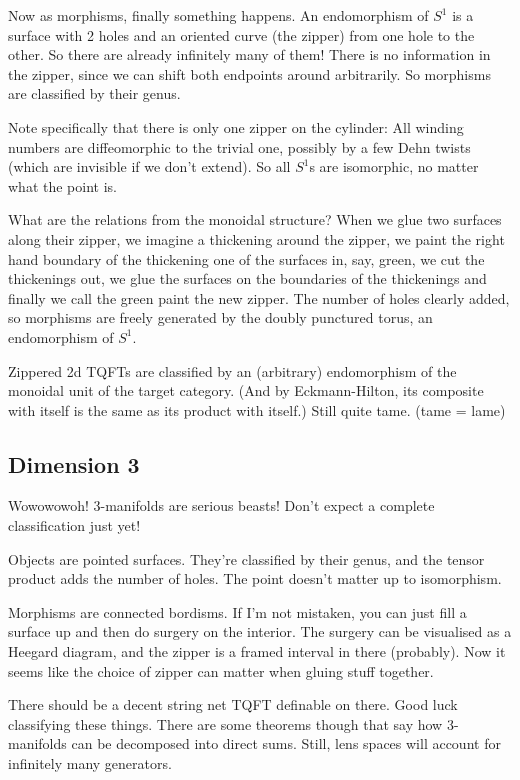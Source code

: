 \documentclass[a4paper]{article}
\begin{document}
Now as morphisms, finally something happens.
An endomorphism of $S^1$ is a surface with 2 holes and an oriented curve (the zipper) from one hole to the other.
So there are already infinitely many of them!
There is no information in the zipper, since we can shift both endpoints around arbitrarily.
So morphisms are classified by their genus.

Note specifically that there is only one zipper on the cylinder:
All winding numbers are diffeomorphic to the trivial one,
possibly by a few Dehn twists (which are invisible if we don't extend).
So all $S^1$s are isomorphic,
no matter what the point is.

What are the relations from the monoidal structure?
When we glue two surfaces along their zipper,
we imagine a thickening around the zipper,
we paint the right hand boundary of the thickening one of the surfaces in, say, green,
we cut the thickenings out,
we glue the surfaces on the boundaries of the thickenings
and finally we call the green paint the new zipper.
The number of holes clearly added,
so morphisms are freely generated by the doubly punctured torus,
an endomorphism of $S^1$.

\begin{proposition}
	Zippered 2d TQFTs are classified by an (arbitrary) endomorphism of the monoidal unit of the target category.
	(And by Eckmann-Hilton, its composite with itself is the same as its product with itself.)
	Still quite tame.
	(tame = lame)
\end{proposition}

\subsection{Dimension 3}

Wowowowoh!
3-manifolds are serious beasts!
Don't expect a complete classification just yet!

Objects are pointed surfaces.
They're classified by their genus,
and the tensor product adds the number of holes.
The point doesn't matter up to isomorphism.

Morphisms are connected bordisms.
If I'm not mistaken,
you can just fill a surface up and then do surgery on the interior.
The surgery can be visualised as a Heegard diagram,
and the zipper is a framed interval in there (probably).
Now it seems like the choice of zipper can matter when gluing stuff together.

There should be a decent string net TQFT definable on there.
Good luck classifying these things.
There are some theorems though that say how 3-manifolds can be decomposed into direct sums.
Still, lens spaces will account for infinitely many generators.
\end{document}

